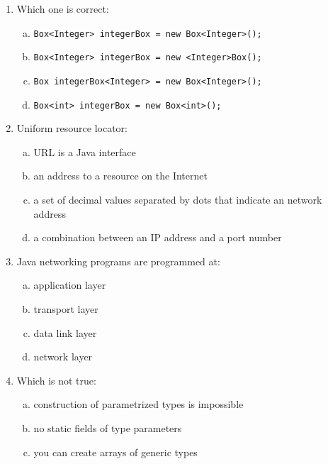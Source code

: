 \documentclass[10pt,a4paper,twocolumn]{article}
\title{} \author{} \date{}
\begin{document}
	\thispagestyle{fancy}
	\fancyhf{}
\begin{enumerate}
\item Which one is correct:
\begin{enumerate}[(a)]
	\item \texttt{Box<Integer> integerBox = new Box<Integer>();}
	\item \texttt{Box<Integer> integerBox = new <Integer>Box();}
	\item \texttt{Box integerBox<Integer> = new Box<Integer>();}
	\item \texttt{Box<int> integerBox = new Box<int>();}
\end{enumerate}
\item Uniform resource locator:
\begin{enumerate}[(a)]
	\item URL is a Java interface
	\item an address to a resource on the Internet
	\item a set of decimal values separated by dots that indicate an network address
	\item a combination between an IP address and a port number
\end{enumerate}
\item Java networking programs are programmed at:
\begin{enumerate}[(a)]
	\item application layer
	\item transport layer
	\item data link layer
	\item network layer
\end{enumerate}
\item Which is not true:
\begin{enumerate}[(a)]
	\item construction of parametrized types is impossible
	\item no static fields of type parameters
	\item you can create arrays of generic types

\end{enumerate}
\end{enumerate}
\end{document}
